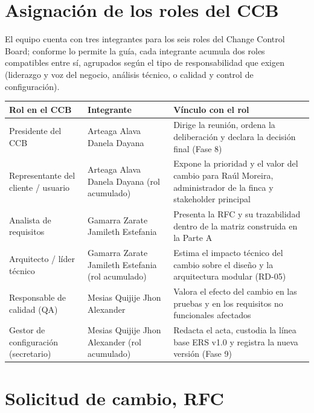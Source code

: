\documentclass[12pt,a4paper]{article}
\begin{document}
\section{Asignación de los roles del CCB }

El equipo cuenta con tres integrantes para los seis roles del Change Control Board; conforme lo permite la guía, cada integrante acumula dos roles compatibles entre sí, agrupados según el tipo de responsabilidad que exigen (liderazgo y voz del negocio, análisis técnico, o calidad y control de configuración).

\begin{table}[H]
\centering
\begin{tabular}{@{}p{4cm}p{4cm}p{6cm}@{}}
\toprule
\textbf{Rol en el CCB} & \textbf{Integrante} & \textbf{Vínculo con el rol} \\
\midrule
Presidente del CCB & Arteaga Alava Danela Dayana & Dirige la reunión, ordena la deliberación y declara la decisión final (Fase 8) \\
Representante del cliente / usuario & Arteaga Alava Danela Dayana (rol acumulado) & Expone la prioridad y el valor del cambio para Raúl Moreira, administrador de la finca y stakeholder principal \\
Analista de requisitos & Gamarra Zarate Jamileth Estefania & Presenta la RFC y su trazabilidad dentro de la matriz construida en la Parte A \\
Arquitecto / líder técnico & Gamarra Zarate Jamileth Estefania (rol acumulado) & Estima el impacto técnico del cambio sobre el diseño y la arquitectura modular (RD-05) \\
Responsable de calidad (QA) & Mesias Quijije Jhon Alexander & Valora el efecto del cambio en las pruebas y en los requisitos no funcionales afectados \\
Gestor de configuración (secretario) & Mesias Quijije Jhon Alexander (rol acumulado) & Redacta el acta, custodia la línea base ERS v1.0 y registra la nueva versión (Fase 9) \\
\bottomrule
\end{tabular}
\end{table}

\section{ Solicitud de cambio, RFC }
\end{document}

